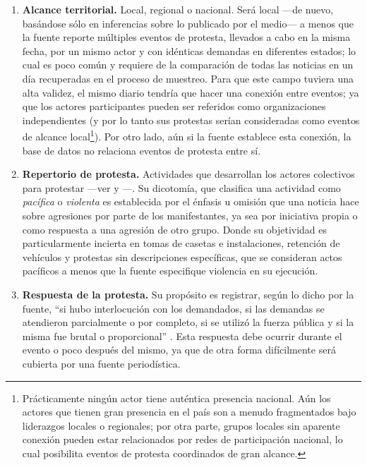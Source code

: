 \documentclass[letterpaper, 11pt]{book}
\theoremstyle{definition}
\theoremstyle{remark}
\begin{document}
\begin{enumerate}
    \item \textbf{Alcance territorial.} Local, regional o nacional. Será local ---de nuevo, basándose sólo en inferencias sobre lo publicado por el medio--- a menos que la fuente reporte múltiples eventos de protesta, llevados a cabo en la misma fecha, por un mismo actor y con idénticas demandas en diferentes estados; lo cual es poco común y requiere de la comparación de todas las noticias en un día recuperadas en el proceso de muestreo. 
    Para que este campo tuviera una alta validez, el mismo diario tendría que hacer una conexión entre eventos; ya que los actores participantes pueden ser referidos como organizaciones independientes (y por lo tanto sus protestas serían consideradas como eventos de alcance local\footnote{
	Prácticamente ningún actor tiene auténtica presencia nacional. 
	Aún los actores que tienen gran presencia en el país son a menudo fragmentados bajo liderazgos locales o regionales; por otra parte, grupos locales sin aparente conexión pueden estar relacionados por redes de participación nacional, lo cual posibilita eventos de protesta coordinados de gran alcance.
    }). 
    Por otro lado, aún si la fuente establece esta conexión, la base de datos no relaciona eventos de protesta entre sí.
    

    \item \textbf{Repertorio de protesta.} Actividades que desarrollan los actores colectivos para protestar ---ver  y ---. 
    Su dicotomía, que clasifica una actividad como \emph{pacífica} o \emph{violenta} es establecida por el énfasis u omisión que una noticia hace sobre agresiones por parte de los manifestantes, ya sea por iniciativa propia o como respuesta a una agresión de otro grupo. 
    Donde su objetividad es particularmente incierta en tomas de casetas e instalaciones, retención de vehículos y protestas sin descripciones específicas, que se consideran actos pacíficos a menos que la fuente especifique violencia en su ejecución.
    

    \item \textbf{Respuesta de la protesta.} Su propósito es registrar, según lo dicho por la fuente, ``si hubo interlocución con los demandados, si las demandas se atendieron parcialmente o por completo, si se utilizó la fuerza pública y si la misma fue brutal o proporcional'' \citep[34]{2017_Cadena_ManualLAOMS}. Esta respuesta debe ocurrir durante el evento o poco después del mismo, ya que de otra forma difícilmente será cubierta por una fuente periodística.

\end{enumerate}
\end{document}
